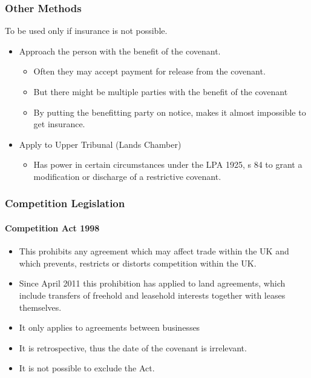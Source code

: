 \documentclass[
]{article}
\providecommand{\tightlist}{%
  \setlength{\itemsep}{0pt}\setlength{\parskip}{0pt}}
\begin{document}
\hypertarget{other-methods}{%
\subsubsection{Other Methods}\label{other-methods}}

To be used only if insurance is not possible.

\begin{itemize}
\tightlist
\item
  Approach the person with the benefit of the covenant.

  \begin{itemize}
  \tightlist
  \item
    Often they may accept payment for release from the covenant.
  \item
    But there might be multiple parties with the benefit of the covenant
  \item
    By putting the benefitting party on notice, makes it almost
    impossible to get insurance.
  \end{itemize}
\item
  Apply to Upper Tribunal (Lands Chamber)

  \begin{itemize}
  \tightlist
  \item
    Has power in certain circumstances under the LPA 1925, s 84 to grant
    a modification or discharge of a restrictive covenant.
  \end{itemize}
\end{itemize}

\hypertarget{competition-legislation}{%
\subsubsection{Competition Legislation}\label{competition-legislation}}

\hypertarget{competition-act-1998}{%
\paragraph{Competition Act 1998}\label{competition-act-1998}}

\begin{itemize}
\tightlist
\item
  This prohibits any agreement which may affect trade within the UK and
  which prevents, restricts or distorts competition within the UK.
\item
  Since April 2011 this prohibition has applied to land agreements,
  which include transfers of freehold and leasehold interests together
  with leases themselves.
\item
  It only applies to agreements between businesses
\item
  It is retrospective, thus the date of the covenant is irrelevant.
\item
  It is not possible to exclude the Act.
\end{itemize}
\end{document}
